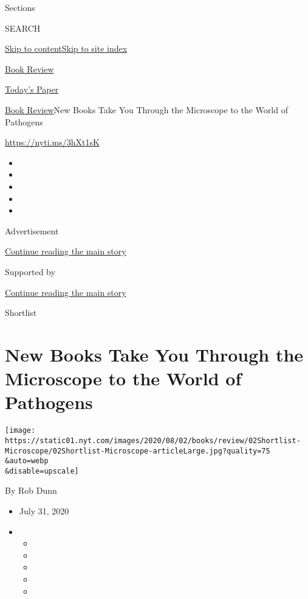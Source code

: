Sections

SEARCH

\protect\hyperlink{site-content}{Skip to
content}\protect\hyperlink{site-index}{Skip to site index}

\href{https://www.nytimes.com/section/books/review}{Book Review}

\href{https://myaccount.nytimes.com/auth/login?response_type=cookie\&client_id=vi}{}

\href{https://www.nytimes.com/section/todayspaper}{Today's Paper}

\href{/section/books/review}{Book Review}\textbar{}New Books Take You
Through the Microscope to the World of Pathogens

\url{https://nyti.ms/3hXt1sK}

\begin{itemize}
\item
\item
\item
\item
\item
\end{itemize}

Advertisement

\protect\hyperlink{after-top}{Continue reading the main story}

Supported by

\protect\hyperlink{after-sponsor}{Continue reading the main story}

Shortlist

\hypertarget{new-books-take-you-through-the-microscope-to-the-world-of-pathogens}{%
\section{New Books Take You Through the Microscope to the World of
Pathogens}\label{new-books-take-you-through-the-microscope-to-the-world-of-pathogens}}

\texttt{[image: https://static01.nyt.com/images/2020/08/02/books/review/02Shortlist-Microscope/02Shortlist-Microscope-articleLarge.jpg?quality=75\\\&auto=webp\\\&disable=upscale]}

By Rob Dunn

\begin{itemize}
\item
  July 31, 2020
\item
  \begin{itemize}
  \item
  \item
  \item
  \item
  \item
  \end{itemize}
\end{itemize}

